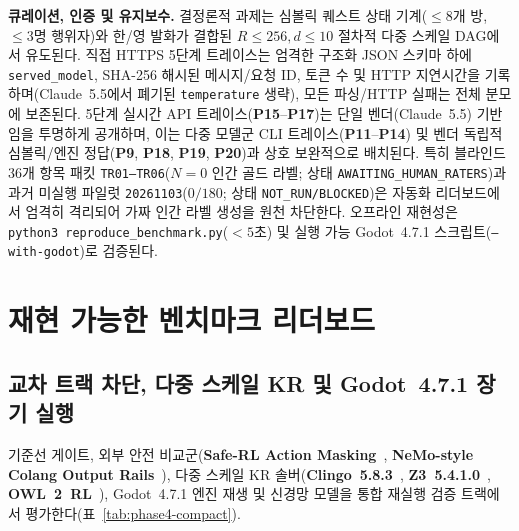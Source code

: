 \textbf{큐레이션, 인증 및 유지보수.} 결정론적 과제는 심볼릭 퀘스트 상태 기계(${\le}8$개 방, ${\le}3$명 행위자)와 한/영 발화가 결합된 $R{\le}256, d{\le}10$ 절차적 다중 스케일 DAG에서 유도된다. 직접 HTTPS 5단계 트레이스는 엄격한 구조화 JSON 스키마 하에 \texttt{served\_model}, SHA-256 해시된 메시지/요청 ID, 토큰 수 및 HTTP 지연시간을 기록하며(Claude~5.5에서 폐기된 \texttt{temperature} 생략), 모든 파싱/HTTP 실패는 전체 분모에 보존된다. 5단계 실시간 API 트레이스(\textbf{P15}--\textbf{P17})는 단일 벤더(Claude~5.5) 기반임을 투명하게 공개하며, 이는 다중 모델군 CLI 트레이스(\textbf{P11}--\textbf{P14}) 및 벤더 독립적 심볼릭/엔진 정답(\textbf{P9}, \textbf{P18}, \textbf{P19}, \textbf{P20})과 상호 보완적으로 배치된다. 특히 블라인드 36개 항목 패킷 \texttt{TR01--TR06}($N{=}0$ 인간 골드 라벨; 상태 \texttt{AWAITING\_HUMAN\_RATERS})과 과거 미실행 파일럿 \texttt{20261103}($0/180$; 상태 \texttt{NOT\_RUN/BLOCKED})은 자동화 리더보드에서 엄격히 격리되어 가짜 인간 라벨 생성을 원천 차단한다. 오프라인 재현성은 \texttt{python3 reproduce\_benchmark.py}($<5$초) 및 실행 가능 Godot~4.7.1 스크립트(\texttt{--with-godot})로 검증된다.

\section{재현 가능한 벤치마크 리더보드}\label{sec:eval}
\subsection{교차 트랙 차단, 다중 스케일 KR 및 Godot~4.7.1 장기 실행}\label{sec:phase4-compact}
기준선 게이트, 외부 안전 비교군(\textbf{Safe-RL Action Masking}~\cite{alshiekh2018shield}, \textbf{NeMo-style Colang Output Rails}~\cite{rebedea2023nemo}), 다중 스케일 KR 솔버(\textbf{Clingo~5.8.3}~\cite{gebser2019clingo}, \textbf{Z3~5.4.1.0}~\cite{demoura2008z3}, \textbf{OWL~2~RL}~\cite{motik2012owl2profiles}), Godot~4.7.1 엔진 재생 및 신경망 모델을 통합 재실행 검증 트랙에서 평가한다(표~\ref{tab:phase4-compact}).

